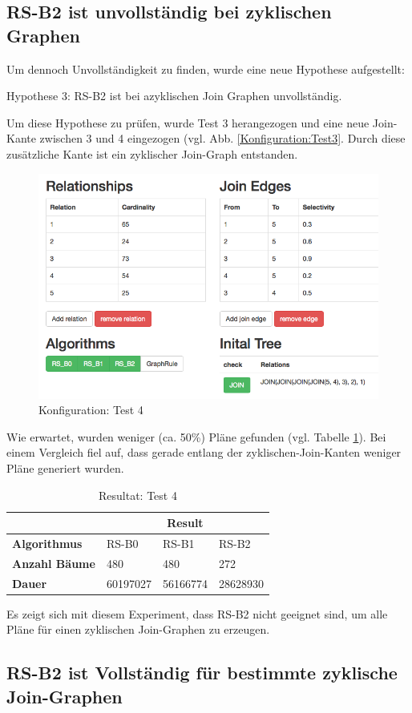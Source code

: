 \subsection{RS-B2 ist unvollständig bei zyklischen Graphen}
Um dennoch Unvollständigkeit zu finden, wurde eine neue Hypothese aufgestellt:

Hypothese 3: RS-B2 ist bei azyklischen Join Graphen unvollständig.

Um diese Hypothese zu prüfen, wurde Test 3 herangezogen und eine neue Join-Kante zwischen 3 und 4 eingezogen (vgl. Abb. \ref{Konfiguration:Test3}. Durch diese zusätzliche Kante ist ein zyklischer Join-Graph entstanden. 


\begin{figure}[ht]
  \centering
  \includegraphics[width=\textwidth]{05_ResultsEvaluation/00_media/Test4.png}
  \caption{Konfiguration: Test 4}
  \label{Konfiguration:Test4}
\end{figure}

Wie erwartet, wurden weniger (ca. 50\%) Pläne gefunden (vgl. Tabelle \ref{Result:Test4}). Bei einem Vergleich fiel auf, dass gerade entlang der zyklischen-Join-Kanten weniger Pläne generiert wurden.


\begin{table}[h]
\centering
\begin{tabular}{|l|l|l|l|}
\hline
                         & \multicolumn{3}{c|}{{\bf Result}} \\ \hline
{\bf Algorithmus}        & RS-B0     & RS-B1     & RS-B2     \\ \hline
{\bf Anzahl Bäume}       & 480       & 480       & 272       \\ \hline
{\bf Dauer}              & 60197027  & 56166774  & 28628930  \\ \hline
\end{tabular}

\caption{Resultat: Test 4}
\label{Result:Test4}
\end{table}

Es zeigt sich mit diesem Experiment, dass RS-B2 nicht geeignet sind, um alle Pläne für einen zyklischen Join-Graphen zu erzeugen.

\subsection{RS-B2 ist Vollständig für bestimmte zyklische Join-Graphen}







